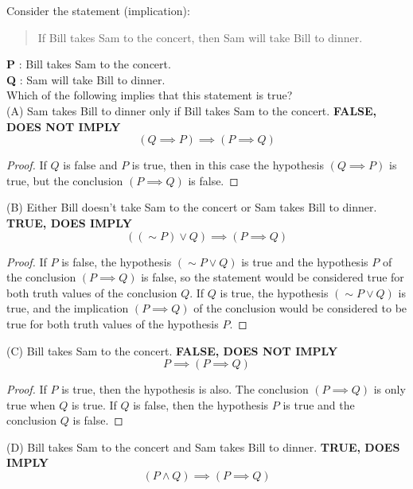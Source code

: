 \documentclass[12pt]{article}
\newenvironment{problem}[2][Problem]{\begin{trivlist}
		\item[\hskip \labelsep {\bfseries #1}\hskip \labelsep {\bfseries #2.}]}{\end{trivlist}}
\begin{document}
\begin{problem}{28}
	Consider the statement (implication):
	\begin{quote}
		If Bill takes Sam to the concert, then Sam will take Bill to dinner.
	\end{quote}
	\textbf{P} : Bill takes Sam to the concert.\\
	\textbf{Q} : Sam will take Bill to dinner.\\
	Which of the following implies that this statement is true?\\
	
	(A) Sam takes Bill to dinner only if Bill takes Sam to the concert. \textbf{ FALSE, DOES NOT IMPLY}
	\begin{equation}
		(Q \implies P) \implies (P \implies Q)
	\end{equation}
	\begin{proof}
		If $Q$ is false and  $P$ is true, then in this case the hypothesis $(Q \implies P)$ is true, but the conclusion $(P \implies Q)$ is false.
	\end{proof}
	(B) Either Bill doesn't take Sam to the concert or Sam takes Bill to dinner. \textbf{ TRUE, DOES IMPLY}
	\begin{equation}
		((\sim P) \vee Q) \implies (P \implies Q)
	\end{equation}
 	\begin{proof}
		If $P$ is false, the hypothesis $(\sim P \vee Q)$ is true and the hypothesis $P$ of the conclusion $(P \implies Q)$ is false, so the statement would be considered true for both truth values of the conclusion $Q$. If $Q$ is true, the hypothesis $(\sim P \vee Q)$ is true, and the implication $(P \implies Q)$ of the conclusion would be considered to be true for both truth values of the hypothesis $P$. 
	\end{proof}
	(C) Bill takes Sam to the concert. \textbf{ FALSE, DOES NOT IMPLY}
	\begin{equation}
		P \implies (P \implies Q)
	\end{equation}
	\begin{proof}
		If $P$ is true, then the hypothesis is also. The conclusion $(P \implies Q)$ is only true when $Q$ is true. If $Q$ is false, then the hypothesis $P$ is true and the conclusion $Q$ is false.
	\end{proof}
	(D) Bill takes Sam to the concert and Sam takes Bill to dinner. \textbf{ TRUE, DOES IMPLY }
	\begin{equation}
		(P\wedge Q) \implies (P \implies Q)
	\end{equation}

\end{problem}
\end{document}
